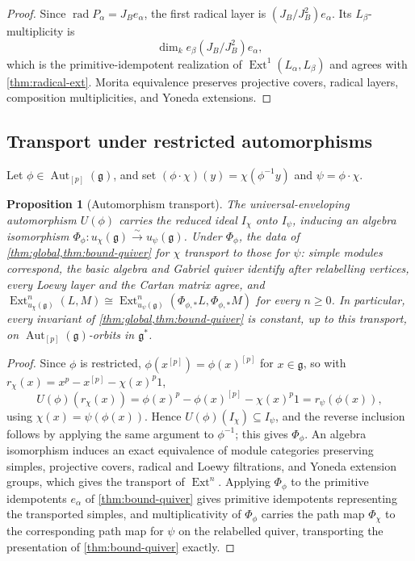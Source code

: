 \documentclass[11pt,reqno]{amsart}
\newtheorem{proposition}[proposition]{Proposition}
\theoremstyle{definition}
\theoremstyle{remark}
\theoremstyle{definition}
\newcommand{\Ext}{\operatorname{Ext}}
\newcommand{\rad}{\operatorname{rad}}
\begin{document}
\begin{proof}
Since $\rad P_\alpha=J_Be_\alpha$, the first radical layer is
$(J_B/J_B^2)e_\alpha$.  Its $L_\beta$-multiplicity is
\[
 \dim_k e_\beta(J_B/J_B^2)e_\alpha,
\]
which is the primitive-idempotent
realization of $\Ext^1(L_\alpha,L_\beta)$ and agrees with
\cref{thm:radical-ext}.  Morita equivalence preserves projective
covers, radical layers, composition multiplicities, and Yoneda extensions.
\end{proof}

\subsection{Transport under restricted automorphisms}

Let $\phi\in\operatorname{Aut}_{[p]}(\mathfrak g)$, and set
$(\phi\cdot\chi)(y)=\chi(\phi^{-1}y)$ and $\psi=\phi\cdot\chi$.

\begin{proposition}[Automorphism transport]\label{prop:orbit-compression}
The universal-enveloping automorphism $U(\phi)$ carries the reduced ideal
$I_\chi$ onto $I_\psi$, inducing an algebra isomorphism
$\Phi_\phi:u_\chi(\mathfrak g)\xrightarrow{\sim}u_\psi(\mathfrak g)$.
Under $\Phi_\phi$, the data of \cref{thm:global,thm:bound-quiver} for
$\chi$ transport to those for $\psi$: simple modules correspond, the basic
algebra and Gabriel quiver identify after relabelling vertices, every
Loewy layer and the Cartan matrix agree, and
$\Ext^n_{u_\chi(\mathfrak g)}(L,M)\cong
\Ext^n_{u_\psi(\mathfrak g)}(\Phi_{\phi,*}L,\Phi_{\phi,*}M)$ for every
$n\ge0$.  In particular, every invariant of \cref{thm:global,thm:bound-quiver}
is constant, up to this transport, on $\operatorname{Aut}_{[p]}(\mathfrak
g)$-orbits in $\mathfrak g^*$.
\end{proposition}

\begin{proof}
Since $\phi$ is restricted, $\phi(x^{[p]})=\phi(x)^{[p]}$ for $x\in
\mathfrak g$, so with $r_\chi(x)=x^p-x^{[p]}-\chi(x)^p1$,
\[
 U(\phi)(r_\chi(x))
 =\phi(x)^p-\phi(x)^{[p]}-\chi(x)^p1
 =r_\psi(\phi(x)),
\]
using $\chi(x)=\psi(\phi(x))$.  Hence $U(\phi)(I_\chi)\subseteq I_\psi$,
and the reverse inclusion follows by applying the same argument to
$\phi^{-1}$; this gives $\Phi_\phi$.  An algebra isomorphism induces an
exact equivalence of module categories preserving simples, projective
covers, radical and Loewy filtrations, and Yoneda extension groups, which
gives the transport of $\Ext^n$.  Applying $\Phi_\phi$ to the primitive
idempotents $e_\alpha$ of \cref{thm:bound-quiver} gives primitive
idempotents representing the transported simples, and multiplicativity of
$\Phi_\phi$ carries the path map $\Phi_\chi$ to the corresponding path map
for $\psi$ on the relabelled quiver, transporting the presentation of
\cref{thm:bound-quiver} exactly.
\end{proof}
\end{document}
